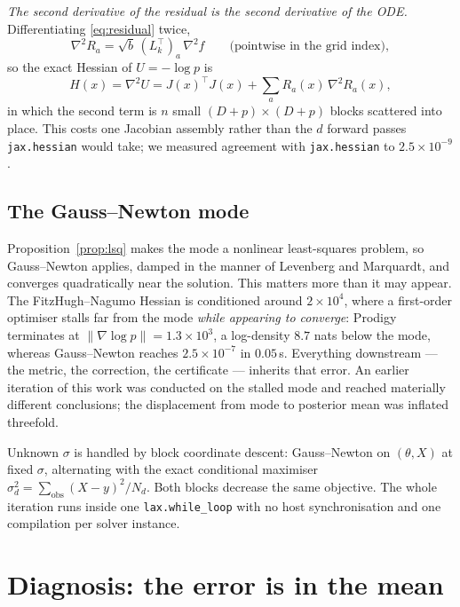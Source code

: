 \documentclass[11pt]{article}
\newcommand{\code}[1]{\texttt{\small #1}}
\theoremstyle{plain}
\theoremstyle{definition}
\theoremstyle{remark}
\begin{document}
\emph{The second derivative of the residual is the second derivative of the ODE.} Differentiating
\eqref{eq:residual} twice,
\begin{equation}
\label{eq:hessR}
  \nabla^2 R_a = \sqrt{b}\,(L_k^\top)_a\, \nabla^2 f \qquad\text{(pointwise in the grid index)},
\end{equation}
so the exact Hessian of $U = -\log p$ is
\begin{equation}
\label{eq:hess}
  H(x) = \nabla^2 U = J(x)^\top J(x) + \textstyle\sum_a R_a(x)\,\nabla^2 R_a(x),
\end{equation}
in which the second term is $n$ small $(D{+}p)\times(D{+}p)$ blocks scattered into place. This
costs one Jacobian assembly rather than the $d$ forward passes \code{jax.hessian} would take; we
measured agreement with \code{jax.hessian} to $2.5\times10^{-9}$.

\subsection{The Gauss--Newton mode}

Proposition~\ref{prop:lsq} makes the mode a nonlinear least-squares problem, so Gauss--Newton
applies, damped in the manner of Levenberg and Marquardt, and converges quadratically near the
solution. This matters more than it may appear. The FitzHugh--Nagumo Hessian is conditioned around $2\times10^4$, where a
first-order optimiser stalls far from the mode \emph{while appearing to converge}: Prodigy
terminates at $\|\nabla\log p\| = 1.3\times 10^3$, a log-density $8.7$ nats below the mode, whereas
Gauss--Newton reaches $2.5\times10^{-7}$ in $0.05$\,s. Everything downstream --- the
metric, the correction, the certificate --- inherits that error. An earlier iteration of this work
was conducted on the stalled mode and reached materially different conclusions; the displacement
from mode to posterior mean was inflated threefold.

Unknown $\sigma$ is handled by block coordinate descent: Gauss--Newton on $(\theta, X)$ at fixed
$\sigma$, alternating with the exact conditional maximiser $\sigma_d^2 = \sum_{\text{obs}}(X-y)^2/N_d$.
Both blocks decrease the same objective. The whole iteration runs inside one \code{lax.while\_loop}
with no host synchronisation and one compilation per solver instance.

\section{Diagnosis: the error is in the mean}
\label{sec:diagnosis}
\end{document}
